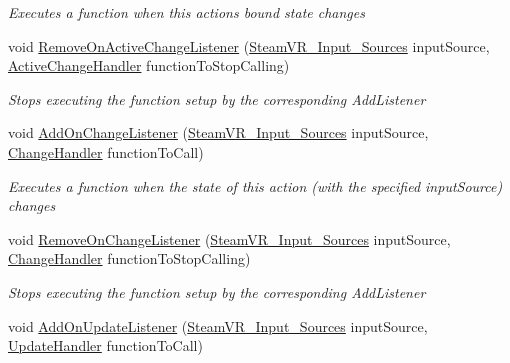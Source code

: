 \begin{DoxyCompactItemize}
\begin{DoxyCompactList}\small\item\em Executes a function when this action\textquotesingle{}s bound state changes \end{DoxyCompactList}\item 
void \mbox{\hyperlink{class_valve_1_1_v_r_1_1_steam_v_r___action___pose_a664b0d917e3abab308a6df857d707d0b}{Remove\+On\+Active\+Change\+Listener}} (\mbox{\hyperlink{namespace_valve_1_1_v_r_a82e5bf501cc3aa155444ee3f0662853f}{Steam\+V\+R\+\_\+\+Input\+\_\+\+Sources}} input\+Source, \mbox{\hyperlink{class_valve_1_1_v_r_1_1_steam_v_r___action___pose_a3861a4b4b8ce246db2cc77e632a7f999}{Active\+Change\+Handler}} function\+To\+Stop\+Calling)
\begin{DoxyCompactList}\small\item\em Stops executing the function setup by the corresponding Add\+Listener \end{DoxyCompactList}\item 
void \mbox{\hyperlink{class_valve_1_1_v_r_1_1_steam_v_r___action___pose_a8743a27cc0bd757b4b5da8d2dce7e5f2}{Add\+On\+Change\+Listener}} (\mbox{\hyperlink{namespace_valve_1_1_v_r_a82e5bf501cc3aa155444ee3f0662853f}{Steam\+V\+R\+\_\+\+Input\+\_\+\+Sources}} input\+Source, \mbox{\hyperlink{class_valve_1_1_v_r_1_1_steam_v_r___action___pose_ac9415e6ad971e70311f59ff1bfb4ea76}{Change\+Handler}} function\+To\+Call)
\begin{DoxyCompactList}\small\item\em Executes a function when the state of this action (with the specified input\+Source) changes \end{DoxyCompactList}\item 
void \mbox{\hyperlink{class_valve_1_1_v_r_1_1_steam_v_r___action___pose_a07b2100fe3b2f2a0649bbbef72b52563}{Remove\+On\+Change\+Listener}} (\mbox{\hyperlink{namespace_valve_1_1_v_r_a82e5bf501cc3aa155444ee3f0662853f}{Steam\+V\+R\+\_\+\+Input\+\_\+\+Sources}} input\+Source, \mbox{\hyperlink{class_valve_1_1_v_r_1_1_steam_v_r___action___pose_ac9415e6ad971e70311f59ff1bfb4ea76}{Change\+Handler}} function\+To\+Stop\+Calling)
\begin{DoxyCompactList}\small\item\em Stops executing the function setup by the corresponding Add\+Listener \end{DoxyCompactList}\item 
void \mbox{\hyperlink{class_valve_1_1_v_r_1_1_steam_v_r___action___pose_a3be9aaaa89040d6d76699c2528ad3c90}{Add\+On\+Update\+Listener}} (\mbox{\hyperlink{namespace_valve_1_1_v_r_a82e5bf501cc3aa155444ee3f0662853f}{Steam\+V\+R\+\_\+\+Input\+\_\+\+Sources}} input\+Source, \mbox{\hyperlink{class_valve_1_1_v_r_1_1_steam_v_r___action___pose_a243e7046a430c572e5be3d1b6b322b6d}{Update\+Handler}} function\+To\+Call)

\end{DoxyCompactItemize}
